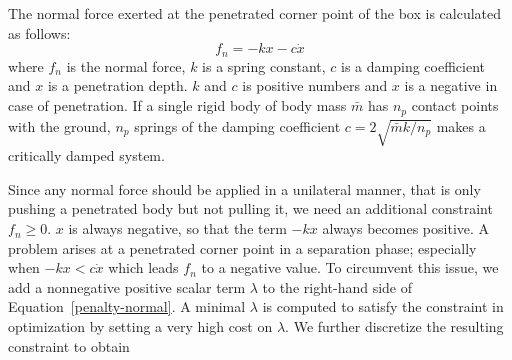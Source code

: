 \documentclass[master,english,final]{kaist-ucs}
\begin{document}
The normal force exerted at the penetrated corner point of the box is calculated as follows:
\begin{equation}\label{penalty-normal}
f_n = -k x - c \dot{x}
\end{equation}
where $f_n$ is the normal force, $k$ is a spring constant, $c$ is a damping coefficient and $x$ is
a penetration depth. $k$ and $c$ is positive numbers and $x$ is a negative in case of penetration.
If a single rigid body of body mass $\bar{m}$ has $n_p$ contact points with the ground,
$n_p$ springs of the damping coefficient $c=2\sqrt{\bar{m}k/n_p}$ makes a critically damped system.

Since any normal force should be applied in a unilateral manner, that is
only pushing a penetrated body but not pulling it, we need an additional constraint $f_n \geq 0$.
$x$ is always negative, so that the term $-kx$ always becomes positive.
A problem arises at a penetrated corner point in a separation phase;
especially when $-kx < c\dot{x}$ which leads $f_n$ to a negative value.
To circumvent this issue, we add a nonnegative positive scalar term $\lambda$ to the right-hand side
of Equation~\eqref{penalty-normal}.
A minimal $\lambda$ is computed to satisfy the constraint in optimization by setting
a very high cost on $\lambda$. We further discretize the resulting constraint to obtain

\end{document}
